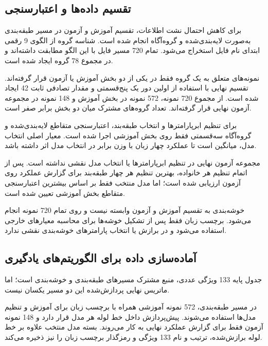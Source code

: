 \documentclass[12pt,a4paper,oneside]{report}
\begin{document}
\subsection{تقسیم داده‌ها و اعتبارسنجی}

برای کاهش احتمال نشت اطلاعات، تقسیم آموزش و آزمون در مسیر طبقه‌بندی به‌صورت لایه‌بندی‌شده و گروه‌آگاه انجام شده است. شناسه گروه از الگوی 9 رقمی ابتدای نام فایل استخراج می‌شود. تمام 720 مسیر فایل با این الگو مطابقت داشته‌اند و در مجموع 78 گروه ایجاد شده است.

نمونه‌های متعلق به یک گروه فقط در یکی از دو بخش آموزش یا آزمون قرار گرفته‌اند. تقسیم نهایی با استفاده از اولین دور یک
پنج‌قسمتی و مقدار تصادفی ثابت 42 ایجاد شده است. از مجموع 720 نمونه، 572 نمونه در بخش آموزش و 148 نمونه در مجموعه آزمون نهایی قرار گرفته‌اند. تعداد گروه‌های مشترک میان دو بخش برابر صفر است.

برای تنظیم ابرپارامترها و انتخاب طبقه‌بند، اعتبارسنجی متقاطع لایه‌بندی‌شده و گروه‌آگاه سه‌قسمتی فقط روی بخش آموزشی اجرا شده است. معیار اصلی انتخاب مدل، میانگین
است تا عملکرد چهار زبان با وزن برابر در انتخاب مدل اثر داشته باشد.

مجموعه آزمون نهایی در تنظیم ابرپارامترها یا انتخاب مدل نقشی نداشته است. پس از اتمام تنظیم هر خانواده، بهترین تنظیم هر چهار طبقه‌بند برای گزارش عملکرد روی آزمون ارزیابی شده است؛ اما مدل منتخب فقط بر اساس بیشترین
اعتبارسنجی متقاطع بخش آموزشی تعیین شده است.

خوشه‌بندی به تقسیم آموزش و آزمون وابسته نیست و روی تمام 720 نمونه انجام می‌شود. برچسب زبان فقط پس از تشکیل خوشه‌ها برای محاسبه معیارهای خارجی استفاده می‌شود و در برازش یا انتخاب پارامترهای خوشه‌بندی نقشی ندارد.


\subsection{آماده‌سازی داده برای الگوریتم‌های یادگیری}

جدول پایه 133 ویژگی عددی، منبع مشترک مسیرهای طبقه‌بندی و خوشه‌بندی است؛ اما ماتریس نهایی پردازش‌شده این دو مسیر یکسان نیست.

در مسیر طبقه‌بندی، 572 نمونه آموزشی همراه با برچسب زبان برای آموزش و تنظیم مدل‌ها استفاده می‌شوند. پیش‌پردازش داخل خط لوله هر مدل قرار دارد و 148 نمونه آزمون فقط برای گزارش عملکرد نهایی به کار می‌روند. بسته مدل منتخب علاوه بر خط لوله برازش‌شده، ترتیب و نام 133 ویژگی و رمزگذار برچسب زبان را نیز ذخیره می‌کند.
\end{document}
